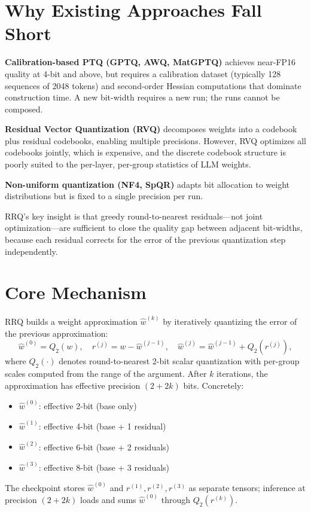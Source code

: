 \documentclass[10pt,twocolumn]{article}
\begin{document}
\section{Why Existing Approaches Fall Short}

\textbf{Calibration-based PTQ (GPTQ, AWQ, MatGPTQ)} achieves near-FP16 quality at
4-bit and above, but requires a calibration dataset (typically 128 sequences of 2048
tokens) and second-order Hessian computations that dominate construction time. A new
bit-width requires a new run; the runs cannot be composed.

\textbf{Residual Vector Quantization (RVQ)} decomposes weights into a codebook plus
residual codebooks, enabling multiple precisions. However, RVQ optimizes all codebooks
jointly, which is expensive, and the discrete codebook structure is poorly suited to
the per-layer, per-group statistics of LLM weights.

\textbf{Non-uniform quantization (NF4, SpQR)} adapts bit allocation to weight
distributions but is fixed to a single precision per run.

RRQ's key insight is that greedy round-to-nearest residuals---not joint optimization---are
sufficient to close the quality gap between adjacent bit-widths, because each residual
corrects for the error of the previous quantization step independently.

\section{Core Mechanism}

RRQ builds a weight approximation $\hat{w}^{(k)}$ by iteratively quantizing the error
of the previous approximation:
\[
\hat{w}^{(0)} = Q_2(w), \quad
r^{(j)} = w - \hat{w}^{(j-1)}, \quad
\hat{w}^{(j)} = \hat{w}^{(j-1)} + Q_2(r^{(j)}),
\]
where $Q_2(\cdot)$ denotes round-to-nearest 2-bit scalar quantization with per-group
scales computed from the range of the argument. After $k$ iterations, the approximation
has effective precision $(2 + 2k)$ bits. Concretely:
\begin{itemize}[itemsep=2pt,parsep=0pt]
  \item $\hat{w}^{(0)}$: effective 2-bit (base only)
  \item $\hat{w}^{(1)}$: effective 4-bit (base + 1 residual)
  \item $\hat{w}^{(2)}$: effective 6-bit (base + 2 residuals)
  \item $\hat{w}^{(3)}$: effective 8-bit (base + 3 residuals)
\end{itemize}
The checkpoint stores $\hat{w}^{(0)}$ and $r^{(1)}, r^{(2)}, r^{(3)}$ as separate
tensors; inference at precision $(2+2k)$ loads and sums $\hat{w}^{(0)}$ through
$Q_2(r^{(k)})$.
\end{document}
